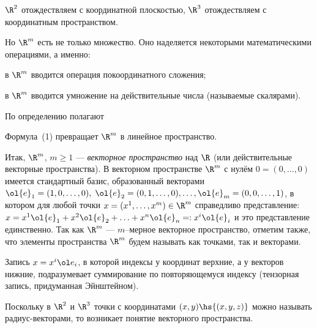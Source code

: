 \documentclass[a4paper]{article}
\newcommand{\emd}[1]{\emph{#1}}
\begin{document}
$\R^2$ отождествляем с координатной плоскостью, $\R^3$ отождествляем
с координатным пространством.

Но $\R^m$ есть не только множество. Оно наделяется некоторыми
математическими операциями, а именно:
\begin{nums}{-2}
\item в $\R^m$ вводится операция покоординатного сложения;
\item в $\R^m$ вводится умножение на действительные числа (называемые
скалярами).
\end{nums}

По определению полагают

Формула~(1) превращает $\R^m$ в линейное пространство.

Итак, $\R^m$, $m\ge 1$ --- \emd{векторное пространство}
над $\R$ (или действительные векторные пространства). В векторном
пространстве $\R^m$ с нулём $0=(0,\ldots,0)$ имеется стандартный
базис, образованный векторами $\ol{e}_1=(1,0,\ldots,0),\;
\ol{e}_2=(0,1,\ldots,0),\ldots,\ol{e}_m=(0,0,\ldots,1)$,
в котором для любой точки $x=(x^1,\ldots,x^m)\in \R^m$ справедливо
представление: $x=x^1 \ol{e}_1+x^2\ol{e}_2+\ldots + x^n
\ol{e}_n =: x^i \ol{e}_i$ и это представление
единственно. Так как $\R^m$ --- $m$--мерное векторное пространство,
отметим также, что элементы пространства $\R^m$ будем называть как
точками, так и векторами.

\begin{note}
Запись $x = x^i\ol e_i$, в которой индексы у координат верхние, а у векторов нижние, подразумевает
суммирование по повторяющемуся индексу (тензорная запись, придуманная Эйнштейном).
\end{note}

Поскольку в $\R^2$ и $\R^3$ точки с координатами $(x,y)\hs{(x,y,z)}$
можно называть радиус-векторами, то возникает понятие векторного
пространства.
\end{document}
